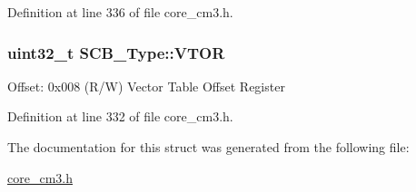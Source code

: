 Definition at line 336 of file core\+\_\+cm3.\+h.

\subsubsection[{\texorpdfstring{V\+T\+OR}{VTOR}}]{ uint32\+\_\+t S\+C\+B\+\_\+\+Type\+::\+V\+T\+OR}\hypertarget{structSCB__Type_a0faf96f964931cadfb71cfa54e051f6f}{}\label{structSCB__Type_a0faf96f964931cadfb71cfa54e051f6f}
Offset\+: 0x008 (R/W) Vector Table Offset Register 

Definition at line 332 of file core\+\_\+cm3.\+h.



The documentation for this struct was generated from the following file\+:\begin{DoxyCompactItemize}
\item 
\hyperlink{core__cm3_8h}{core\+\_\+cm3.\+h}\end{DoxyCompactItemize}
